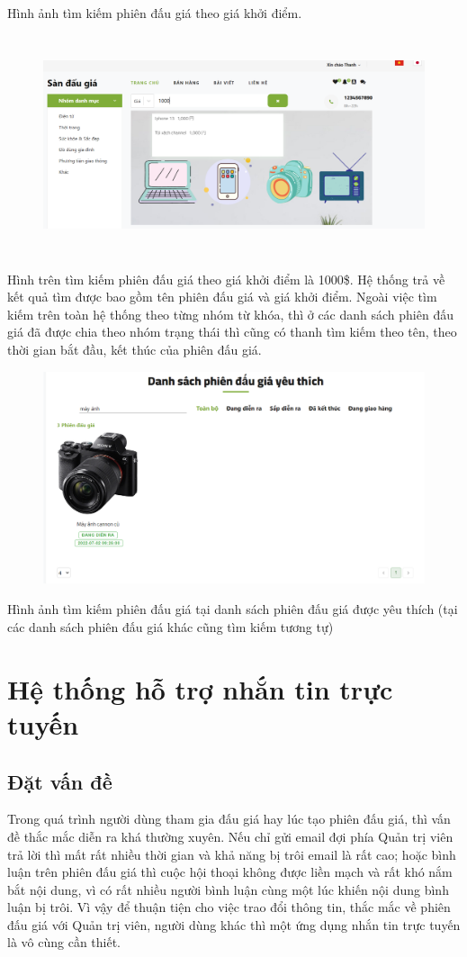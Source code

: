 \documentclass[../DoAn.tex]{subfiles}
\begin{document}
Hình ảnh tìm kiếm phiên đấu giá theo giá khởi điểm.
\begin{figure}[H]
    \centering
    \includegraphics[width=0.75\linewidth,height=6.44cm]{Hinhve/searchprice.png}
\end{figure}
Hình trên tìm kiếm phiên đấu giá theo giá khởi điểm là 1000\$. Hệ thống trả về kết quả tìm được bao gồm tên phiên đấu giá và giá khởi điểm.
Ngoài việc tìm kiếm trên toàn hệ thống theo từng nhóm từ khóa, thì ở các danh sách phiên đấu giá đã được chia theo nhóm trạng thái thì cũng có thanh tìm kiếm theo tên, theo thời gian bắt đầu, kết thúc của phiên đấu giá. 
\begin{figure}[H]
    \centering
    \includegraphics[width=0.75\linewidth,height=6.25cm]{Hinhve/searchlike.png}
\end{figure}
Hình ảnh tìm kiếm phiên đấu giá tại danh sách phiên đấu giá được yêu thích (tại các danh sách phiên đấu giá khác cũng tìm kiếm tương tự)
\section{Hệ thống hỗ trợ nhắn tin trực tuyến}
\subsection{Đặt vấn đề}
Trong quá trình người dùng tham gia đấu giá hay lúc tạo phiên đấu giá, thì vấn đề thắc mắc diễn ra khá thường xuyên.  Nếu chỉ gửi email đợi phía Quản trị viên trả lời thì mất rất nhiều thời gian và khả năng bị trôi email là rất cao; hoặc bình luận trên phiên đấu giá thì cuộc hội thoại không được liền mạch và rất khó nắm bắt nội dung, vì có rất nhiều người bình luận cùng một lúc khiến nội dung bình luận bị trôi. Vì vậy để thuận tiện cho việc trao đổi thông tin, thắc mắc về phiên đấu giá với Quản trị viên, người dùng khác thì một ứng dụng nhắn tin trực tuyến là vô cùng cần thiết. 
\end{document}
